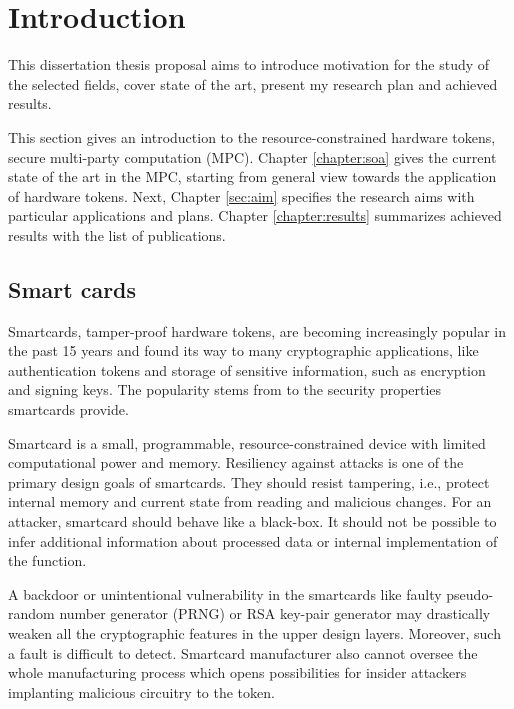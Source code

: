 \documentclass[
  digital, %
  twoside, %
  table,   %
  lof,     %
  lot,     %
]{fithesis3}
\newcounter{ph4_show_guides}
\theoremstyle{definition}
\theoremstyle{remark}
\begin{document}
\setlength{\marginparwidth}{2.5cm}   %
\setcounter{biburlnumpenalty}{5000}  %


\chapter{Introduction}\label{sec:intro}

This dissertation thesis proposal aims to introduce motivation for the study of the selected fields, cover state of the art, present my research plan and achieved results.

This section gives an introduction to the resource-constrained hardware tokens, secure multi-party computation (MPC). Chapter \ref{chapter:soa} gives the current state of the art in the MPC, starting from general view towards the application of hardware tokens. Next, Chapter \ref{sec:aim} specifies the research aims with particular applications and plans. Chapter \ref{chapter:results} summarizes achieved results with the list of publications. 

\section{Smart cards}
Smartcards, tamper-proof hardware tokens, are becoming increasingly popular in the past 15 years and found its way to many cryptographic applications, like authentication tokens and storage of sensitive information, such as encryption and signing keys. The popularity stems from to the security properties smartcards provide. 

Smartcard is a small, programmable, resource-constrained device with limited computational power and memory. Resiliency against attacks is one of the primary design goals of smartcards.
They should resist tampering, i.e., protect internal memory and current state from reading and malicious changes. For an attacker, smartcard should behave like a black-box. It should not be possible to infer additional information about processed data or internal implementation of the function.

A backdoor or unintentional vulnerability in the smartcards like faulty pseudo-random number generator (PRNG) or RSA key-pair generator may drastically weaken all the cryptographic features in the upper design layers. Moreover, such a fault is difficult to detect. 
Smartcard manufacturer also cannot oversee the whole manufacturing process which opens possibilities for insider attackers implanting malicious circuitry to the token.
\end{document}
